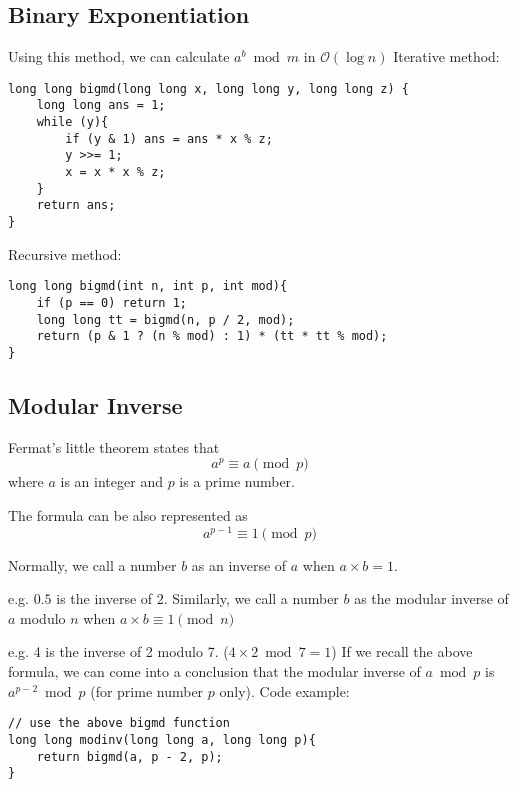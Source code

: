 \documentclass{article}
\begin{document}
\subsection{Binary Exponentiation}
Using this method, we can calculate $a^b \bmod{m}$ in $\mathcal{O}(\log{n})$
\linebreak
\linebreak
Iterative method:
\begin{verbatim}
long long bigmd(long long x, long long y, long long z) {
    long long ans = 1;
    while (y){
        if (y & 1) ans = ans * x % z;
        y >>= 1;
        x = x * x % z;
    }
    return ans;
}
\end{verbatim}

Recursive method:

\begin{verbatim}
long long bigmd(int n, int p, int mod){
    if (p == 0) return 1;
    long long tt = bigmd(n, p / 2, mod);
    return (p & 1 ? (n % mod) : 1) * (tt * tt % mod);
}
\end{verbatim}

\subsection{Modular Inverse}
Fermat's little theorem states that
$$a^p \equiv a \pmod{p}$$
where $a$ is an integer and $p$ is a prime number.

The formula can be also represented as
$$a^{p - 1} \equiv 1 \pmod{p}$$

Normally, we call a number $b$ as an inverse of $a$ when $a \times b = 1$.

e.g. $0.5$ is the inverse of $2$.
\linebreak
\linebreak
Similarly, we call a number $b$ as the modular inverse of $a$ modulo $n$ when $a \times b \equiv 1 \pmod{n}$

e.g. 4 is the inverse of 2 modulo 7. ($4 \times 2 \bmod{7} = 1$)
\linebreak
\linebreak
If we recall the above formula, we can come into a conclusion that
the modular inverse of $a \bmod{p}$ is $a^{p - 2} \bmod{p}$ (for prime number $p$ only).
\linebreak
\linebreak
Code example:
\begin{verbatim}
// use the above bigmd function
long long modinv(long long a, long long p){
    return bigmd(a, p - 2, p);
}
\end{verbatim}
\end{document}
